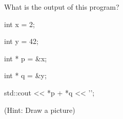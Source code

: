 What is the output of this program?



\begin{consolethree}[escapeinside=||]

int x = 2;

int y = 42;

int * p = &x;

int * q = &y;

std::cout << *p + *q << '\n';

\end{consolethree}

(Hint: Draw a picture)

